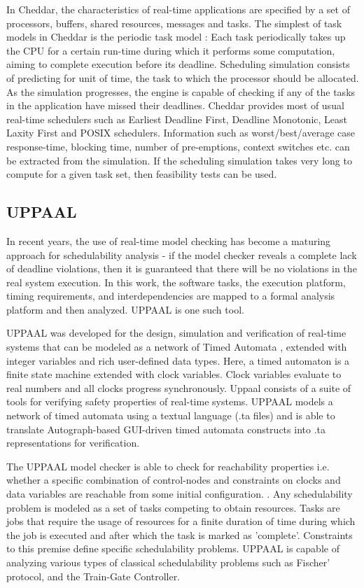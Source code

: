 In Cheddar, the characteristics of real-time applications are specified by a set of processors, buffers, shared resources, messages and tasks. The simplest of task models in Cheddar is the periodic task model \cite{liu1973scheduling}: Each task periodically takes up the CPU for a certain run-time during which it performs some computation, aiming to complete execution before its deadline. Scheduling simulation consists of predicting for unit of time, the task to which the processor should be allocated. As the simulation progresses, the engine is capable of checking if any of the tasks in the application have missed their deadlines. Cheddar provides most of usual real-time schedulers such as Earliest Deadline First, Deadline Monotonic, Least Laxity First and POSIX schedulers. Information such as worst/best/average case response-time, blocking time, number of pre-emptions, context switches etc. can be extracted from the simulation. If the scheduling simulation takes very long to compute for a given task set, then feasibility tests can be used. 

\subsection{UPPAAL}

In recent years, the use of real-time model checking has become a maturing approach for schedulability analysis - if the model checker reveals a complete lack of deadline violations, then it is guaranteed that there will be no violations in the real system execution. In this work, the software tasks, the execution platform, timing requirements, and interdependencies are mapped to a formal analysis platform and then analyzed. UPPAAL \cite{larsen1997uppaal, bengtsson1996uppaal, david2009model} is one such tool. 

UPPAAL was developed for the design, simulation and verification of real-time systems that can be modeled as a network of Timed Automata \cite{Alur1994}, extended with integer variables and rich user-defined data types. Here, a timed automaton is a finite state machine extended with clock variables. Clock variables evaluate to real numbers and all clocks progress synchronously. Uppaal consists of a suite of tools for verifying safety properties of real-time systems. UPPAAL models a network of timed automata using a textual language (.ta files) and is able to translate Autograph-based GUI-driven timed automata constructs into .ta representations for verification.

The UPPAAL model checker is able to check for reachability properties i.e. whether a specific combination of control-nodes and constraints on clocks and data variables are reachable from some initial configuration. . Any schedulability problem is modeled as a set of tasks competing to obtain resources. Tasks are jobs that require the usage of resources for a finite duration of time during which the job is executed and after which the task is marked as 'complete'. Constraints to this premise define specific schedulability problems. UPPAAL is capable of analyzing various types of classical schedulability problems such as Fischer' protocol, and the Train-Gate Controller.

